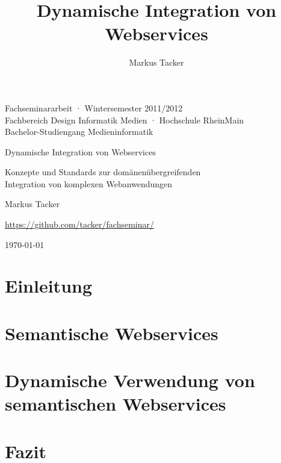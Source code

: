 \documentclass[10pt,a4paper]{article}
\begin{document}
\author{Markus Tacker}
\title{Dynamische Integration von Webservices}

\begin{center}

\begin{small}Fachseminararbeit · Wintersemester 2011/2012\\Fachbereich Design Informatik Medien · Hochschule RheinMain\\Bachelor-Studiengang Medieninformatik\end{small}

\bigskip

\begin{huge}Dynamische Integration von Webservices\end{huge}

\begin{small}Konzepte und Standards zur domänenübergreifenden\\Integration von komplexen Webanwendungen\end{small}

\bigskip

\begin{large}Markus Tacker\end{large}

\begin{small}\url{https://github.com/tacker/fachseminar/}\end{small}

\today

\end{center}



\section{Einleitung}
\label{l:einleitung}


\section{Semantische Webservices}
\label{l:sem-web-ser}


\section{Dynamische Verwendung von semantischen Webservices}
\label{l:loesungen}


\section{Fazit}
\label{l:fazit}



\end{document}
